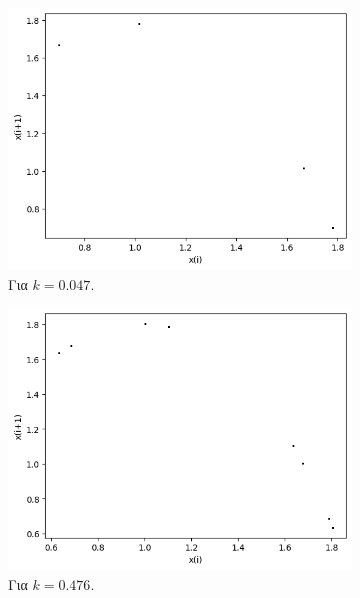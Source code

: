 \begin{figure}[h!]
\begin{subfigure}[b]{0.4\textwidth}
		\includegraphics[width=\textwidth]{LateX images/graphs/k047}
		\caption{Για $k=0.047$.}
		\label{f:k3}
	\end{subfigure}
	\hfill
	\begin{subfigure}[b]{0.4\textwidth}
		\centering
		\includegraphics[width=\textwidth]{LateX images/graphs/k0476}
		\caption{Για $k=0.476$.}
		\label{f:k4}
	\end{subfigure}
	\hfill
	\begin{subfigure}[b]{0.4\textwidth}
		\centering

\end{subfigure}
\end{figure}
